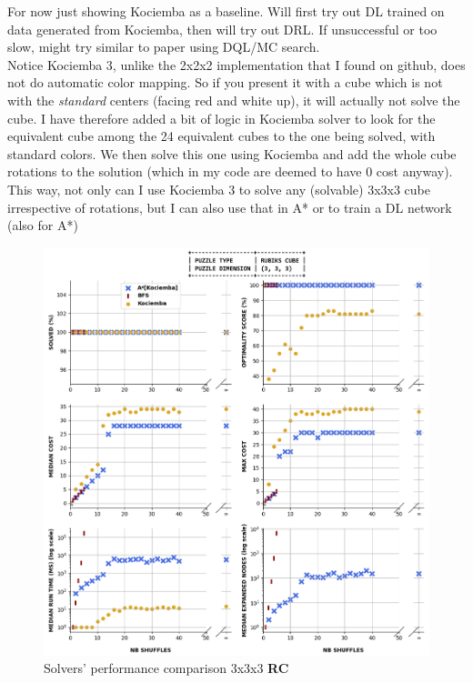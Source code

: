 \label{sec:ResRubiks333}

For now just showing Kociemba as a baseline. Will first try out DL trained on data generated from Kociemba, then will try out DRL. If unsuccessful or too slow, might try similar to paper using DQL/MC search.
\\
Notice Kociemba 3, unlike the 2x2x2 implementation that I found on github, does not do automatic color mapping. So if you present it with a cube which is not with the \textit{standard} centers (facing red and white up), it will actually not solve the cube. I have therefore added a bit of logic in Kociemba solver to look for the equivalent cube among the 24 equivalent cubes to the one being solved, with standard colors. We then solve this one using Kociemba and add the whole cube rotations to the solution (which in my code are deemed to have 0 cost anyway). This way, not only can I use Kociemba 3 to solve any (solvable) 3x3x3 cube irrespective of rotations, but I can also use that in A* or to train a DL network (also for A*)




\begin{figure}[H]
\centering
\includegraphics[scale=0.50]{./Figures/333RCPerformance}
\caption[333RCPerformance]{Solvers' performance comparison 3x3x3 \textbf{RC}}
\label{fig:333RCPerformance}
\end{figure}

